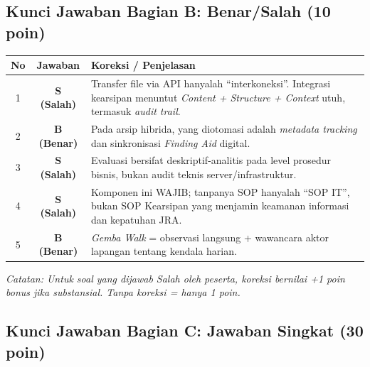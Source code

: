 \documentclass[12pt,a4paper]{report}
\begin{document}
\vspace{0.5cm}

\subsection{Kunci Jawaban Bagian B: Benar/Salah (10 poin)}

\renewcommand{\arraystretch}{1.4}
\begin{center}
\begin{tabularx}{0.95\textwidth}{@{} c c X @{}}
\toprule
\textbf{No} & \textbf{Jawaban} & \textbf{Koreksi / Penjelasan} \\
\midrule
1 & \textbf{S (Salah)} & Transfer file via API hanyalah ``interkoneksi''. Integrasi kearsipan menuntut \textit{Content + Structure + Context} utuh, termasuk \textit{audit trail}. \\
2 & \textbf{B (Benar)} & Pada arsip hibrida, yang diotomasi adalah \textit{metadata tracking} dan sinkronisasi \textit{Finding Aid} digital. \\
3 & \textbf{S (Salah)} & Evaluasi bersifat deskriptif-analitis pada level prosedur bisnis, bukan audit teknis server/infrastruktur. \\
4 & \textbf{S (Salah)} & Komponen ini WAJIB; tanpanya SOP hanyalah ``SOP IT'', bukan SOP Kearsipan yang menjamin keamanan informasi dan kepatuhan JRA. \\
5 & \textbf{B (Benar)} & \textit{Gemba Walk} = observasi langsung + wawancara aktor lapangan tentang kendala harian. \\
\bottomrule
\end{tabularx}
\end{center}
\renewcommand{\arraystretch}{1.0}

\vspace{0.3cm}
\textit{Catatan: Untuk soal yang dijawab Salah oleh peserta, koreksi bernilai +1 poin bonus jika substansial. Tanpa koreksi = hanya 1 poin.}

\vspace{0.5cm}

\subsection{Kunci Jawaban Bagian C: Jawaban Singkat (30 poin)}
\end{document}
